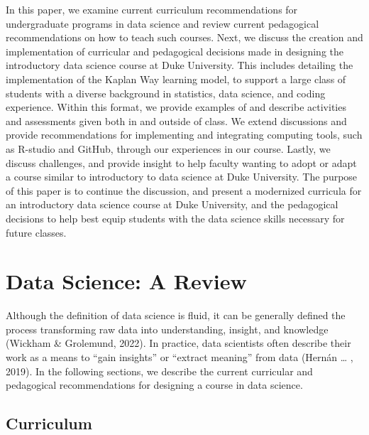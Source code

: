 \documentclass[
  12pt]{article}
\begin{document}
In this paper, we examine current curriculum recommendations for
undergraduate programs in data science and review current pedagogical
recommendations on how to teach such courses. Next, we discuss the
creation and implementation of curricular and pedagogical decisions made
in designing the introductory data science course at Duke University.
This includes detailing the implementation of the Kaplan Way learning
model, to support a large class of students with a diverse background in
statistics, data science, and coding experience. Within this format, we
provide examples of and describe activities and assessments given both
in and outside of class. We extend discussions and provide
recommendations for implementing and integrating computing tools, such
as R-studio and GitHub, through our experiences in our course. Lastly,
we discuss challenges, and provide insight to help faculty wanting to
adopt or adapt a course similar to introductory to data science at Duke
University. The purpose of this paper is to continue the discussion, and
present a modernized curricula for an introductory data science course
at Duke University, and the pedagogical decisions to help best equip
students with the data science skills necessary for future classes.

\hypertarget{sec-review}{%
\section{Data Science: A Review}\label{sec-review}}

Although the definition of data science is fluid, it can be generally
defined the process transforming raw data into understanding, insight,
and knowledge (Wickham \& Grolemund, 2022). In practice, data scientists
often describe their work as a means to ``gain insights'' or ``extract
meaning'' from data (Hernán \ldots{} , 2019). In the following sections,
we describe the current curricular and pedagogical recommendations for
designing a course in data science.

\hypertarget{sec-curr}{%
\subsection{Curriculum}\label{sec-curr}}
\end{document}
